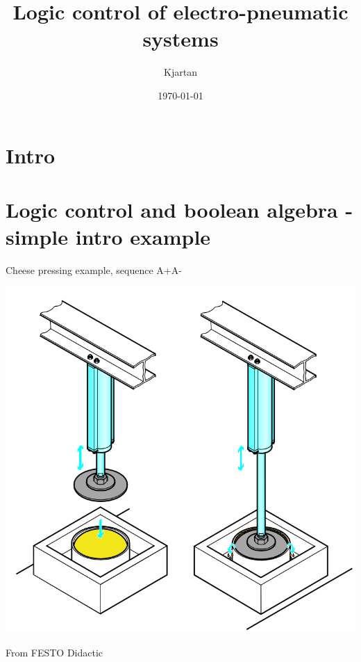 \documentclass[presentation,aspectratio=1610]{beamer}
\author{Kjartan}
\date{\today}
\title{Logic control of electro-pneumatic systems}
\begin{document}
\maketitle

\section{Intro}
\label{sec:org77d523c}


\section{Logic control and boolean algebra - simple intro example}
\label{sec:org44ecb28}
\begin{frame}[label={sec:orgdaf1bfc}]{Cheese pressing example, sequence A+A-}
\begin{center}
\includegraphics[width=0.5\linewidth]{../../figures/cheese-stamping.png}
\end{center}
{\tiny From FESTO Didactic}
\end{frame}
\end{document}
